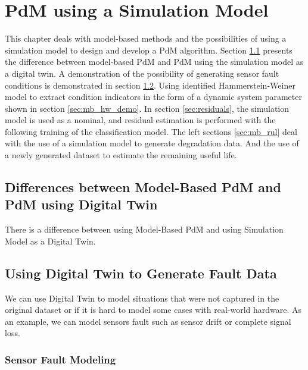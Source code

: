 %


\chapter{PdM using a Simulation Model}\label{ch:mb}
This chapter deals with model-based methods and the possibilities of using
a simulation model to design and develop a PdM algorithm.  Section
\ref{sec:diffs_mb_dt} presents the difference between model-based PdM and
PdM using the simulation model as a digital twin.  A demonstration of the
possibility of generating sensor fault conditions is demonstrated in
section \ref{sec:sensor_fault_generation}.  Using identified
Hammerstein-Weiner model to extract condition indicators in the form of a
dynamic system parameter shown in section \ref{sec:mb_hw_demo}.  In section
\ref{sec:residuals}, the simulation model is used as a nominal, and
residual estimation is performed with the following training of the
classification model.  The left sections \ref{sec:mb_rul} deal with the use
of a simulation model to generate degradation data. And the use of a newly
generated dataset to estimate the remaining useful life.


\section{Differences between Model-Based PdM and PdM using Digital Twin}\label{sec:diffs_mb_dt}
There is a difference between using Model-Based PdM and using Simulation
Model as a Digital Twin.

\section{Using Digital Twin to Generate Fault Data}\label{sec:sensor_fault_generation}
We can use Digital Twin to model situations that were not captured in the
original dataset or if it is hard to model some cases with real-world
hardware. As an example, we can model sensors fault such as sensor drift or
complete signal loss.

\subsection{Sensor Fault Modeling}

